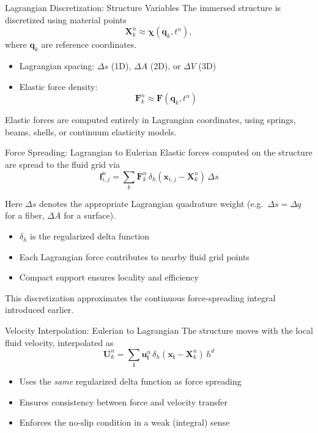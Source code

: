 \documentclass{beamer}
\begin{document}
\begin{frame}{Lagrangian Discretization: Structure Variables}
\small
The immersed structure is discretized using material points
\[
\mathbf{X}_k^n \approx \boldsymbol{\chi}(\mathbf{q}_k, t^n),
\]
where $\mathbf{q}_k$ are reference coordinates.

\medskip
\begin{itemize}
    \item Lagrangian spacing: $\Delta s$ (1D), $\Delta A$ (2D), or $\Delta V$ (3D)
    \item Elastic force density:
    \[
    \mathbf{F}_k^n \approx \mathbf{F}(\mathbf{q}_k, t^n)
    \]
\end{itemize}

\medskip
Elastic forces are computed entirely in Lagrangian coordinates,
using springs, beams, shells, or continuum elasticity models.
\end{frame}

\begin{frame}{Force Spreading: Lagrangian to Eulerian}
\small
Elastic forces computed on the structure are spread to the fluid grid via
\[
\mathbf{f}_{i,j}^n
=
\sum_k
\mathbf{F}_k^n\,
\delta_h(\mathbf{x}_{i,j} - \mathbf{X}_k^n)\,
\Delta s
\]

\medskip
Here $\Delta s$ denotes the appropriate Lagrangian quadrature weight
(e.g.\ $\Delta s=\Delta q$ for a fiber, $\Delta A$ for a surface).


\medskip
\begin{itemize}
    \item $\delta_h$ is the regularized delta function
    \item Each Lagrangian force contributes to nearby fluid grid points
    \item Compact support ensures locality and efficiency
\end{itemize}

\medskip
This discretization approximates the continuous force-spreading integral
introduced earlier.
\end{frame}

\begin{frame}{Velocity Interpolation: Eulerian to Lagrangian}
\small
The structure moves with the local fluid velocity, interpolated as
\[
\mathbf{U}_k^n
=
\sum_{\mathbf{i}}
\mathbf{u}_{\mathbf{i}}^n\,
\delta_h(\mathbf{x}_{\mathbf{i}} - \mathbf{X}_k^n)\,
h^{d}
\]


\medskip
\begin{itemize}
    \item Uses the \emph{same} regularized delta function as force spreading
    \item Ensures consistency between force and velocity transfer
    \item Enforces the no-slip condition in a weak (integral) sense
\end{itemize}
\end{frame}
\end{document}
